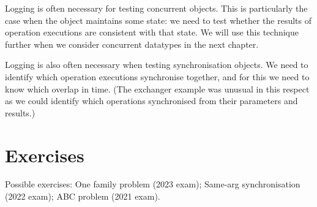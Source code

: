 Logging is often necessary for testing concurrent objects.  This is
particularly the case when the object maintains some state: we need to test
whether the results of operation executions are consistent with that state.
We will use this technique further when we consider concurrent datatypes in
the next chapter.

Logging is also often necessary when testing synchronisation objects.  We need
to identify which operation executions synchronise together, and for this we
need to know which overlap in time.  (The exchanger example was unusual in
this respect as we could identify which operations synchronised from their
parameters and results.)
 



\section*{Exercises}





Possible  exercises:
One family problem (2023 exam);
Same-arg synchronisation (2022 exam);
ABC problem (2021 exam).


